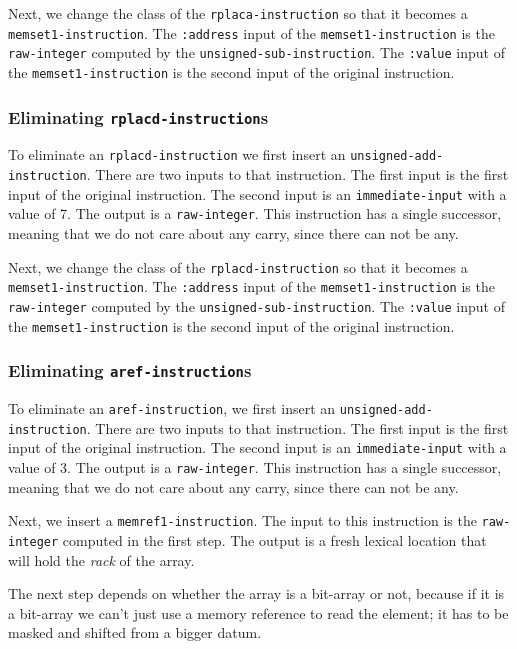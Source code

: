 Next, we change the class of the \texttt{rplaca-instruction} so that
it becomes a \texttt{memset1-instruction}.  The \texttt{:address}
input of the \texttt{memset1-instruction} is the \texttt{raw-integer}
computed by the \texttt{unsigned-sub-instruction}.  The
\texttt{:value} input of the \texttt{memset1-instruction} is the
second input of the original instruction.

\subsubsection{Eliminating \texttt{rplacd-instruction}s}

To eliminate an \texttt{rplacd-instruction} we first insert an
\texttt{unsigned-add-instruction}.  There are two inputs to that
instruction.  The first input is the first input of the original
instruction.  The second input is an \texttt{immediate-input} with a
value of 7.  The output is a \texttt{raw-integer}.  This instruction
has a single successor, meaning that we do not care about any carry,
since there can not be any.

Next, we change the class of the \texttt{rplacd-instruction} so that
it becomes a \texttt{memset1-instruction}.  The \texttt{:address}
input of the \texttt{memset1-instruction} is the \texttt{raw-integer}
computed by the \texttt{unsigned-sub-instruction}.  The
\texttt{:value} input of the \texttt{memset1-instruction} is the
second input of the original instruction.

\subsubsection{Eliminating \texttt{aref-instruction}s}

To eliminate an \texttt{aref-instruction}, we first insert an
\texttt{unsigned-add-instruction}.  There are two inputs to that
instruction.  The first input is the first input of the original
instruction.  The second input is an \texttt{immediate-input} with a
value of 3.  The output is a \texttt{raw-integer}.  This instruction
has a single successor, meaning that we do not care about any carry,
since there can not be any.

Next, we insert a \texttt{memref1-instruction}.  The input to this
instruction is the \texttt{raw-integer} computed in the first step.
The output is a fresh lexical location that will hold the \emph{rack}
of the array.

The next step depends on whether the array is a bit-array or not,
because if it is a bit-array we can't just use a memory reference to
read the element; it has to be masked and shifted from a bigger
datum.

